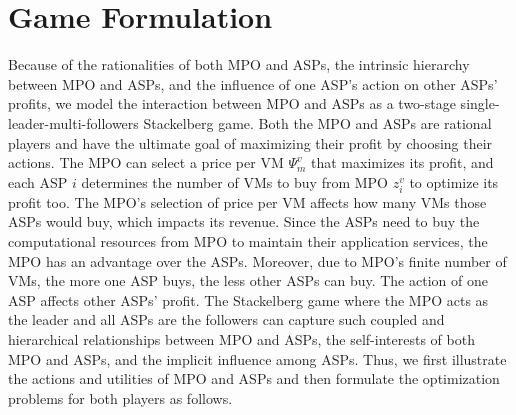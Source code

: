 \documentclass[10pt,journal, compsoc]{IEEEtran}
\begin{document}
\section{Game Formulation}\label{sec:game_formulations}
Because of the rationalities of both MPO and ASPs, the intrinsic hierarchy between MPO and ASPs, and the influence of one ASP's action on other ASPs' profits, we model the interaction between MPO and ASPs as a two-stage single-leader-multi-followers Stackelberg game. Both the MPO and ASPs are rational players and have the ultimate goal of maximizing their profit by choosing their actions. The MPO can select a price per VM $\Psi_{m}^v$ that maximizes its profit, and each ASP $i$ determines the number of VMs to buy from MPO $z_i^v$ to optimize its profit too. The MPO's selection of price per VM affects how many VMs those ASPs would buy, which impacts its revenue. Since the ASPs need to buy the computational resources from MPO to maintain their application services, the MPO has an advantage over the ASPs. Moreover, due to MPO's finite number of VMs, the more one ASP buys, the less other ASPs can buy. The action of one ASP affects other ASPs' profit. The Stackelberg game where the MPO acts as the leader and all ASPs are the followers can capture such coupled and hierarchical relationships between MPO and ASPs, the self-interests of both MPO and ASPs, and the implicit influence among ASPs. Thus, we first illustrate the actions and utilities of MPO and ASPs and then formulate the optimization problems for both players as follows.
\end{document}
